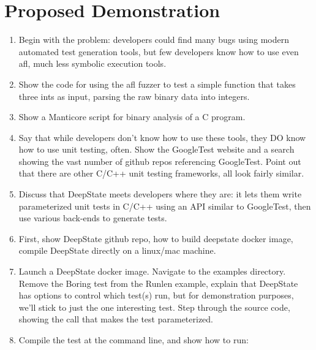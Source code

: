 \documentclass[sigconf]{acmart}
\begin{document}



\newpage

\appendix
\section{Proposed Demonstration}

\begin{enumerate}

\item

  Begin with the problem:  developers could find many bugs using modern automated test generation tools, but few developers know how to use even afl, much less symbolic execution tools.

\item  Show the code for using the afl fuzzer to test a simple function that takes three ints as input, parsing the raw binary data into integers.

\item Show a Manticore script for binary analysis of a C program.

\item Say that while developers don't know how to use these tools, they DO know how to use unit testing, often.  Show the GoogleTest website and a search showing the vast number of github repos referencing GoogleTest.  Point out that there are other C/C++ unit testing frameworks, all look fairly similar.

\item Discuss that DeepState meets developers where they are:  it lets them write parameterized unit tests in C/C++ using an API similar to GoogleTest, then use various back-ends to generate tests.
  
\item

  First, show DeepState github repo, how to build deepstate docker image, compile DeepState directly on a linux/mac machine.

\item

  Launch a DeepState docker image.  Navigate to the examples directory.  Remove the Boring test from the Runlen example, explain that DeepState has options to control which test(s) run, but for demonstration purposes, we'll stick to just the one interesting test.  Step through the source code, showing the call that makes the test parameterized.

\item Compile the test at the command line, and show how to run:


\end{enumerate}
\end{document}
